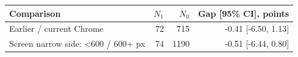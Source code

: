 \begin{tabular}{lrrr}
\toprule
Comparison & $N_1$ & $N_0$ & Gap [95\% CI], points \\
\midrule
Earlier / current Chrome & 72 &  715 & -0.41 [-6.50, 1.13] \\
Screen narrow side: <600 / 600+ px & 74 & 1190 & -0.51 [-6.44, 0.80] \\
\bottomrule
\end{tabular}
